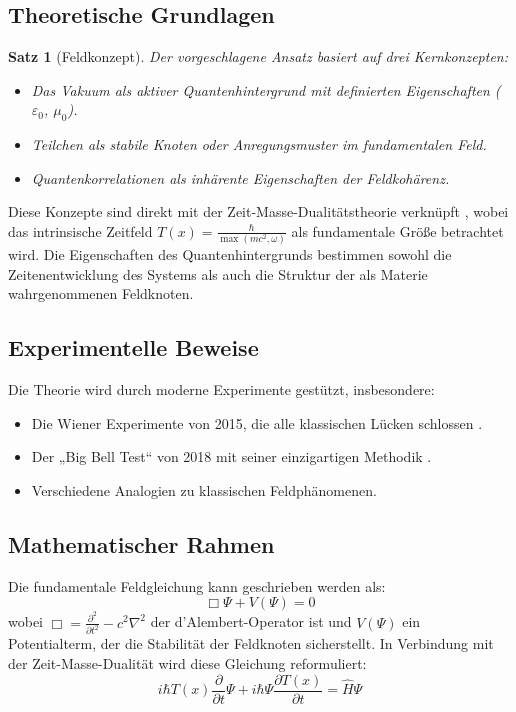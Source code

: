 \documentclass[a4paper,12pt]{article}
\newcommand{\Tfield}{T(x)}
\newtheorem{theorem}{Satz}[section]
\begin{document}
	\subsection{Theoretische Grundlagen}
	\begin{theorem}[Feldkonzept]
		Der vorgeschlagene Ansatz basiert auf drei Kernkonzepten:
		\begin{itemize}
			\item Das Vakuum als aktiver Quantenhintergrund mit definierten Eigenschaften (\(\varepsilon_0\), \(\mu_0\)).
			\item Teilchen als stabile Knoten oder Anregungsmuster im fundamentalen Feld.
			\item Quantenkorrelationen als inhärente Eigenschaften der Feldkohärenz.
		\end{itemize}
	\end{theorem}
	Diese Konzepte sind direkt mit der Zeit-Masse-Dualitätstheorie verknüpft \cite{Pascher2024}, wobei das intrinsische Zeitfeld \( \Tfield = \frac{\hbar}{\max(m c^2, \omega)} \) als fundamentale Größe betrachtet wird. Die Eigenschaften des Quantenhintergrunds bestimmen sowohl die Zeitenentwicklung des Systems als auch die Struktur der als Materie wahrgenommenen Feldknoten.
	
	\subsection{Experimentelle Beweise}
	Die Theorie wird durch moderne Experimente gestützt, insbesondere:
	\begin{itemize}
		\item Die Wiener Experimente von 2015, die alle klassischen Lücken schlossen \cite{Giustina2015}.
		\item Der „Big Bell Test“ von 2018 mit seiner einzigartigen Methodik \cite{BigBellTest2018}.
		\item Verschiedene Analogien zu klassischen Feldphänomenen.
	\end{itemize}
	
	\subsection{Mathematischer Rahmen}
	Die fundamentale Feldgleichung kann geschrieben werden als:
	\begin{equation}
		\Box \Psi + V(\Psi) = 0
	\end{equation}
	wobei \( \Box = \frac{\partial^2}{\partial t^2} - c^2 \nabla^2 \) der d’Alembert-Operator ist und \( V(\Psi) \) ein Potentialterm, der die Stabilität der Feldknoten sicherstellt. In Verbindung mit der Zeit-Masse-Dualität wird diese Gleichung reformuliert:
	\begin{equation}
		i\hbar \Tfield \frac{\partial}{\partial t} \Psi + i\hbar \Psi \frac{\partial \Tfield}{\partial t} = \hat{H} \Psi
	\end{equation}
	
\end{document}
